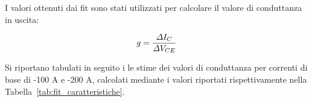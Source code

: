 \documentclass[../main.tex]{subfiles}
\begin{document}


    I valori ottenuti dai fit sono stati utilizzati per calcolare il valore
    di conduttanza in uscita:

    \begin{equation*}
        \centering
        g = \frac{\varDelta I_C}{\varDelta V_{CE}}
    \end{equation*}

    Si riportano tabulati in seguito i le stime dei valori di conduttanza
    per correnti di base di -100 \textmu A e -200 \textmu A, calcolati mediante
    i valori riportati rispettivamente nella Tabella~\ref{tab:fit_caratteristiche}.
\end{document}
